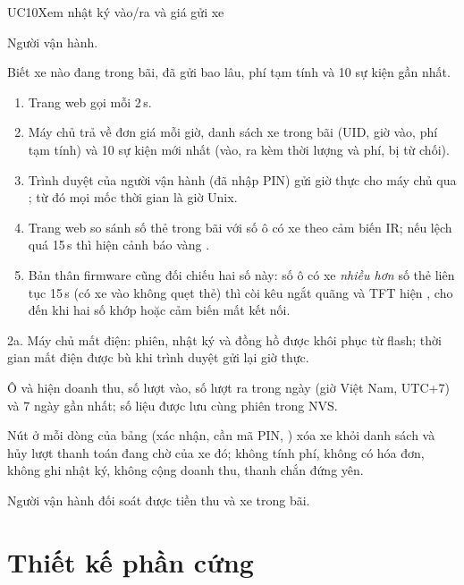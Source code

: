 \begin{usecase}{UC10}{Xem nhật ký vào/ra và giá gửi xe}
\item[Tác nhân] Người vận hành.
\item[Mô tả] Biết xe nào đang trong bãi, đã gửi bao lâu, phí tạm tính và 10 sự kiện gần nhất.
\item[Luồng chính] \begin{enumerate}[nosep,leftmargin=1.3em]
  \item Trang web gọi  mỗi 2\,s.
  \item Máy chủ trả về đơn giá mỗi giờ, danh sách xe trong bãi (UID, giờ vào, phí tạm tính) và
        10 sự kiện mới nhất (vào, ra kèm thời lượng và phí, bị từ chối).
  \item Trình duyệt của người vận hành (đã nhập PIN) gửi giờ thực cho máy chủ qua
        ; từ đó mọi mốc thời gian là giờ Unix.
  \item Trang web so sánh số thẻ trong bãi với số ô có xe theo cảm biến IR; nếu lệch quá 15\,s thì
        hiện cảnh báo vàng .
  \item Bản thân firmware cũng đối chiếu hai số này: số ô có xe \emph{nhiều hơn} số thẻ liên tục 15\,s
        (có xe vào không quẹt thẻ) thì còi kêu ngắt quãng và TFT hiện , cho đến khi
        hai số khớp hoặc cảm biến mất kết nối.
\end{enumerate}
\item[Ngoại lệ] 2a. Máy chủ mất điện: phiên, nhật ký và đồng hồ được khôi phục từ flash;
  thời gian mất điện được bù khi trình duyệt gửi lại giờ thực.
\item[Luồng phụ] Ô  và  hiện doanh thu, số lượt vào, số lượt ra
  trong ngày (giờ Việt Nam, UTC+7) và 7 ngày gần nhất; số liệu được lưu cùng phiên trong NVS.
\item[Xóa xe] Nút  ở mỗi dòng của bảng  (xác nhận, cần mã PIN,
  ) xóa xe khỏi danh sách và hủy lượt thanh toán đang chờ của xe đó;
  không tính phí, không có hóa đơn, không ghi nhật ký, không cộng doanh thu, thanh chắn đứng yên.
\item[Hậu điều kiện] Người vận hành đối soát được tiền thu và xe trong bãi.
\end{usecase}



\section{Thiết kế phần cứng}\label{sec:phancung}
